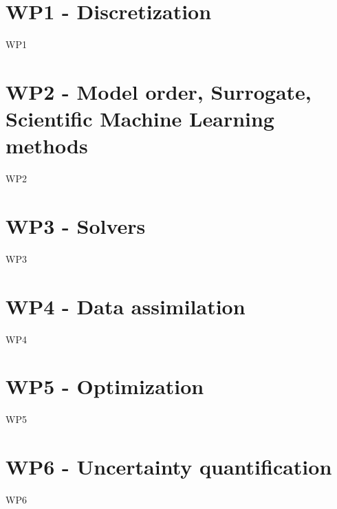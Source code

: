 \chapter{WP1 - Discretization}
\label{chap:wp1}
\clearpage
{WP1}

\chapter{WP2 - Model order, Surrogate, Scientific Machine Learning methods}
\label{chap:wp2}
\clearpage
{WP2}

\chapter{WP3 - Solvers}
\label{chap:wp3}
\clearpage
{WP3}

\chapter{WP4 - Data assimilation}
\label{chap:wp4}
\clearpage
{WP4}

\chapter{WP5 - Optimization}
\label{chap:wp5}
\clearpage
{WP5}

\chapter{WP6 - Uncertainty quantification}
\label{chap:wp6}
\clearpage
{WP6}

